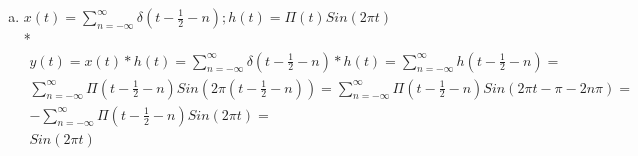 \documentclass[10pt, letterpaper]{article}
\begin{document}
\begin{enumerate}[a.]
\item
$x(t) = \sum_{n = -\infty}^{\infty} \delta(t - \frac{1}{2} - n) ; h(t) = \Pi(t)Sin(2\pi t)$\\*
\begin{align*}
	y(t) = x(t) * h(t) = \sum_{n = -\infty}^{\infty} \delta(t - \frac{1}{2} - n) * h(t)	= 
	\sum_{n = -\infty}^{\infty}h(t - \frac{1}{2} - n) = \\
	\sum_{n = -\infty}^{\infty} \Pi(t - \frac{1}{2} - n)Sin(2\pi (t - \frac{1}{2} - n)) = 
	\sum_{n = -\infty}^{\infty} \Pi(t - \frac{1}{2} - n)Sin(2\pi t - \pi - 2 n \pi ) = \\
	-\sum_{n = -\infty}^{\infty} \Pi(t - \frac{1}{2} - n)Sin(2\pi t) = \\
	\boxed{Sin(2\pi t)}
\end{align*}
\end{enumerate}
\end{document}
